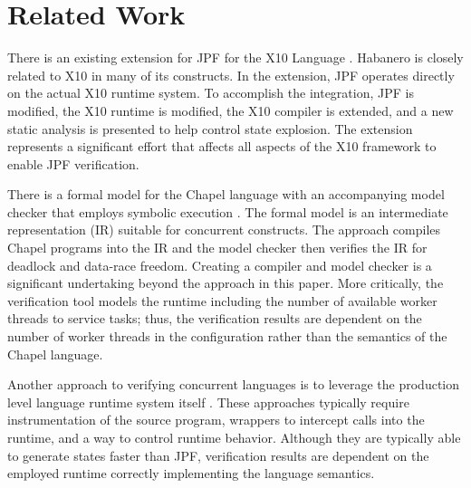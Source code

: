 \section{Related Work}

There is an existing extension for JPF for the X10 Language
\cite{conf:icst:GligoricMM12,x10}. Habanero is closely related to X10 in many of
its constructs. In the extension, JPF operates directly on the actual X10
runtime system. To accomplish the integration, JPF is modified, the X10 runtime
is modified, the X10 compiler is extended, and a new static analysis is
presented to help control state explosion. The extension represents a
significant effort that affects all aspects of the X10 framework to enable JPF
verification. 

There is a formal model for the Chapel language with an accompanying model
checker that employs symbolic execution \cite{chapel}. The formal model is an
intermediate representation (IR) suitable for concurrent constructs. The
approach compiles Chapel programs into the IR and the model checker then
verifies the IR for deadlock and data-race freedom. Creating a compiler and
model checker is a significant undertaking beyond the approach in this paper.
More critically, the verification tool models the runtime including the number
of available worker threads to service tasks; thus, the verification results are
dependent on the number of worker threads in the configuration rather than the
semantics of the Chapel language. 

\begin{comment} In this paper, correctness is a property of the HJ language
semantics with the given HJ program and not any aspect of the runtime
implementation. Verifying the HJ runtime system implements HJ semantics is a
verification problem separate from verifying that an HJ program is data-race
free.  \end{comment}

Another approach to verifying concurrent languages is to leverage the production
level language runtime system itself
 \cite{Vakkalanka:2008:DVM:1427782.1427794,Vo:2009:FVP:1594835.1504214,5644885,6113841}.
These approaches typically require instrumentation of the source program,
wrappers to intercept calls into the runtime, and a way to control runtime
behavior. Although they are typically able to generate states faster than JPF,
verification results are dependent on the employed runtime correctly
implementing the language semantics. 


